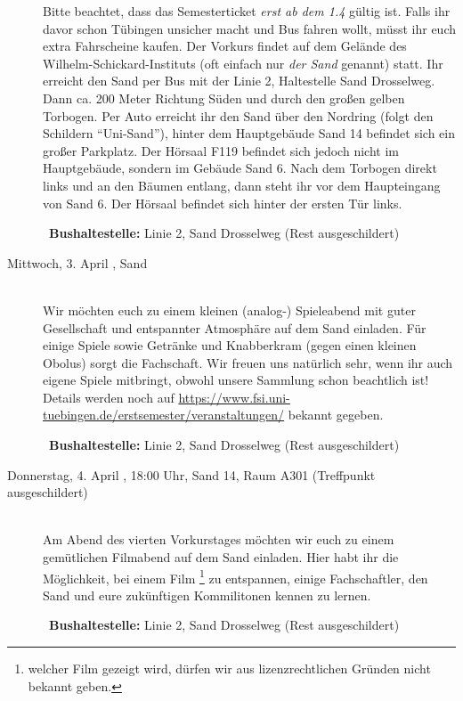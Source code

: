 \begin{description}
\ifsommersemester
Bitte beachtet, dass das Semesterticket \emph{erst ab dem 1.4} gültig ist. Falls ihr davor schon Tübingen unsicher macht und Bus fahren wollt, müsst ihr euch extra Fahrscheine kaufen.
\fi
Der Vorkurs findet auf dem Gelände des Wilhelm-Schickard-Instituts (oft einfach nur \emph{der Sand} genannt) statt. Ihr erreicht den Sand per Bus mit der Linie 2, Haltestelle Sand Drosselweg. Dann ca. 200 Meter Richtung Süden und durch den großen gelben Torbogen. Per Auto erreicht ihr den Sand über den Nordring (folgt den Schildern "`Uni-Sand"'), hinter dem Hauptgebäude Sand 14 befindet sich ein großer Parkplatz. Der Hörsaal F119 befindet sich jedoch nicht im Hauptgebäude, sondern im Gebäude Sand 6. Nach dem Torbogen direkt links und an den Bäumen entlang, dann steht ihr vor dem Haupteingang von Sand 6. Der Hörsaal befindet sich hinter der ersten Tür links.

~\textbf{Bushaltestelle:} Linie 2, Sand Drosselweg (Rest ausgeschildert)


\item[Mittwoch, 3. April \YEAR, Sand]\ \\
Wir möchten euch zu einem kleinen (analog-) Spieleabend mit guter Gesellschaft und entspannter Atmosphäre auf dem Sand einladen. Für einige Spiele sowie Getränke und Knabberkram (gegen einen kleinen Obolus) sorgt die Fachschaft. Wir freuen uns natürlich sehr, wenn ihr auch eigene Spiele mitbringt, obwohl unsere Sammlung schon beachtlich ist! Details werden noch auf \url{https://www.fsi.uni-tuebingen.de/erstsemester/veranstaltungen/} bekannt gegeben.

~\textbf{Bushaltestelle:} Linie 2, Sand Drosselweg (Rest ausgeschildert)

\item[Donnerstag, 4. April \YEAR, 18:00 Uhr, Sand 14, Raum A301 (Treffpunkt ausgeschildert)]\ \\
Am Abend des vierten Vorkurstages möchten wir euch zu einem gemütlichen Filmabend auf dem Sand einladen.
Hier habt ihr die Möglichkeit, bei einem Film \footnote{welcher Film gezeigt wird, dürfen wir aus lizenzrechtlichen Gründen nicht bekannt geben.} zu entspannen, einige Fachschaftler, den Sand und eure zukünftigen Kommilitonen kennen zu lernen.

~\textbf{Bushaltestelle:} Linie 2, Sand Drosselweg (Rest ausgeschildert)


\end{description}

